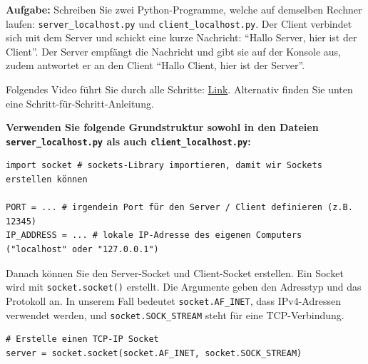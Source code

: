 

\begin{myexercise}\label{ex:chat-localhost}

    \textbf{Aufgabe:} Schreiben Sie zwei Python-Programme, welche auf demselben Rechner laufen: \texttt{server\_localhost.py} und \texttt{client\_localhost.py}. Der Client verbindet sich mit dem Server und schickt eine kurze Nachricht: \enquote{Hallo Server, hier ist der Client}. Der Server empfängt die Nachricht und gibt sie auf der Konsole aus, zudem antwortet er an den Client \enquote{Hallo Client, hier ist der Server}.

    Folgendes Video führt Sie durch alle Schritte: \href{https://youtu.be/1ECIEdc3TdA}{Link}. Alternativ finden Sie unten eine Schritt-für-Schritt-Anleitung.

    \textbf{Verwenden Sie folgende Grundstruktur sowohl in den Dateien \texttt{server\_localhost.py} als auch \texttt{client\_localhost.py}:}

    \begin{lstlisting}
import socket # sockets-Library importieren, damit wir Sockets erstellen können

PORT = ... # irgendein Port für den Server / Client definieren (z.B. 12345)
IP_ADDRESS = ... # lokale IP-Adresse des eigenen Computers ("localhost" oder "127.0.0.1")
    \end{lstlisting}

    Danach können Sie den Server-Socket und Client-Socket erstellen. Ein Socket wird mit \lstinline|socket.socket()| erstellt. Die Argumente geben den Adresstyp und das Protokoll an. In unserem Fall bedeutet \lstinline|socket.AF_INET|, dass IPv4-Adressen verwendet werden, und \lstinline|socket.SOCK_STREAM| steht für eine \gls{TCP}-Verbindung.

    \begin{lstlisting}
# Erstelle einen TCP-IP Socket
server = socket.socket(socket.AF_INET, socket.SOCK_STREAM)
    \end{lstlisting}


\end{myexercise}
